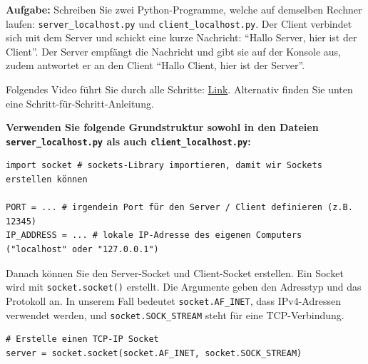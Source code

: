 

\begin{myexercise}\label{ex:chat-localhost}

    \textbf{Aufgabe:} Schreiben Sie zwei Python-Programme, welche auf demselben Rechner laufen: \texttt{server\_localhost.py} und \texttt{client\_localhost.py}. Der Client verbindet sich mit dem Server und schickt eine kurze Nachricht: \enquote{Hallo Server, hier ist der Client}. Der Server empfängt die Nachricht und gibt sie auf der Konsole aus, zudem antwortet er an den Client \enquote{Hallo Client, hier ist der Server}.

    Folgendes Video führt Sie durch alle Schritte: \href{https://youtu.be/1ECIEdc3TdA}{Link}. Alternativ finden Sie unten eine Schritt-für-Schritt-Anleitung.

    \textbf{Verwenden Sie folgende Grundstruktur sowohl in den Dateien \texttt{server\_localhost.py} als auch \texttt{client\_localhost.py}:}

    \begin{lstlisting}
import socket # sockets-Library importieren, damit wir Sockets erstellen können

PORT = ... # irgendein Port für den Server / Client definieren (z.B. 12345)
IP_ADDRESS = ... # lokale IP-Adresse des eigenen Computers ("localhost" oder "127.0.0.1")
    \end{lstlisting}

    Danach können Sie den Server-Socket und Client-Socket erstellen. Ein Socket wird mit \lstinline|socket.socket()| erstellt. Die Argumente geben den Adresstyp und das Protokoll an. In unserem Fall bedeutet \lstinline|socket.AF_INET|, dass IPv4-Adressen verwendet werden, und \lstinline|socket.SOCK_STREAM| steht für eine \gls{TCP}-Verbindung.

    \begin{lstlisting}
# Erstelle einen TCP-IP Socket
server = socket.socket(socket.AF_INET, socket.SOCK_STREAM)
    \end{lstlisting}


\end{myexercise}
